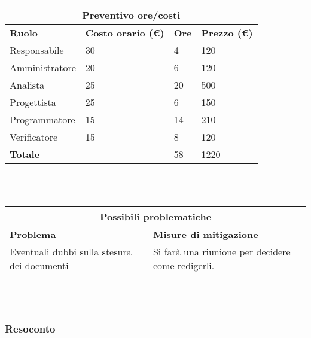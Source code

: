 \documentclass[a4paper, 12pt]{article}
\begin{document}
\begin{center}
    \begin{tabularx}{\textwidth}{|X|X|X|X|}
        \hline
        \multicolumn{4}{|c|}{\textbf{Preventivo ore/costi}}\\
        \hline
        \hline
        \textbf{Ruolo} & \textbf{Costo orario (\euro)} & \textbf{Ore} & \textbf{Prezzo (\euro)}\\
        \hline
        Responsabile    & 30 & 4  & 120\\
        \hline
        Amministratore  & 20 & 6  & 120\\
        \hline
        Analista        & 25 & 20  & 500\\
        \hline
        Progettista     & 25 & 6  & 150\\
        \hline
        Programmatore   & 15 & 14  & 210\\
        \hline
        Verificatore    & 15 & 8  & 120\\
        \hline
        \hline
        \textbf{Totale} &    & 58 & 1220\\
        \hline
    \end{tabularx}\\[8pt]
    \mbox{}\\
\end{center}

\begin{center}
    \begin{tabularx}{\textwidth}{|X|X|}
        \hline
        \multicolumn{2}{|c|}{\textbf{Possibili problematiche}}\\
        \hline
        \hline
        \textbf{Problema} & \textbf{Misure di mitigazione}\\
        \hline
        Eventuali dubbi sulla stesura dei documenti & Si farà una riunione per decidere come redigerli.\\
        \hline
    \end{tabularx}\\[8pt]
    \mbox{}\\
\end{center}

\subsubsection{Resoconto}\mbox{}
\end{document}

